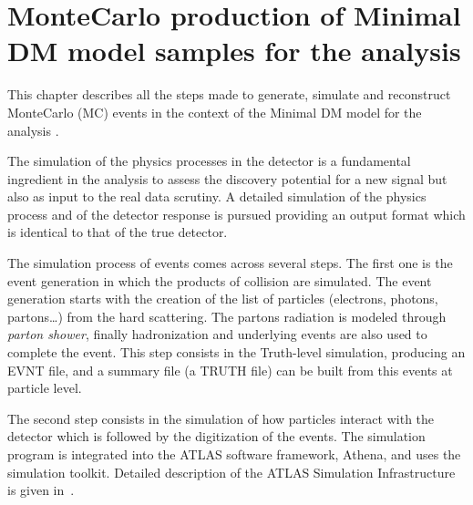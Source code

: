 \chapter[MonteCarlo samples production]{MonteCarlo production of Minimal DM model samples for the \mph analysis}
\label{chapt:mc}

\lettrine{T}{}his chapter describes all the steps made to generate, simulate and reconstruct MonteCarlo (MC) events in the context of the Minimal DM model for the \mph analysis .


The simulation of the physics processes in the detector is a fundamental ingredient in the analysis to assess the discovery potential for a new signal but also as input to the real data scrutiny.
A detailed simulation  of the physics process and of the detector response is pursued providing an output format which is identical to that of the true detector. 

The simulation process of events comes across several steps. The first one is the event generation in which the products of \pp collision are simulated. The event generation starts with the creation of the list of particles (electrons, photons, partons\dots) from the hard scattering. The partons radiation is modeled through \emph{parton shower}, finally hadronization and underlying events are also used to complete the event. This step consists in the Truth-level simulation, producing an EVNT file, and a summary file (a TRUTH file) can be built from this events at particle level.

The second step consists in the simulation of how particles interact with the detector which is followed by the digitization of the events. The simulation program is integrated into the ATLAS software framework, Athena, and uses the \geant \cite{geant4} simulation toolkit. Detailed description of the ATLAS Simulation Infrastructure is given in~\cite{simulation}.

